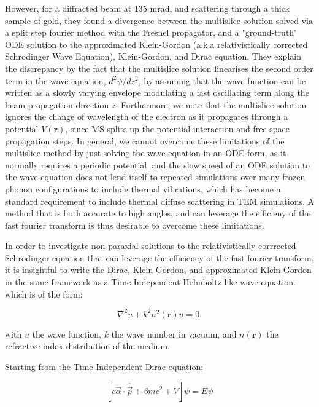 \documentclass{article}
\begin{document}
However, for a diffracted beam at 135 mrad, and scattering through a thick sample of gold, they found a divergence between the multislice solution solved via a split step fourier method with the Fresnel propagator,
and a "ground-truth" ODE solution to the approximated Klein-Gordon (a.k.a relativistically corrected Schrodinger Wave Equation), Klein-Gordon, and Dirac equation.
They explain the discrepancy by the fact that the multislice solution linearises the second order term in the wave equation,
$d^2 \psi / dz^2$, by assuming that the wave function can be written as a slowly varying envelope modulating a fast oscillating term along the beam propagation direction $z$.
Furthermore, we note that the multislice solution ignores the change of wavelength of the electron as it propagates through a potential $V(\mathbf{r})$, since MS splits up the potential interaction and free space propagation steps.
In general, we cannot overcome these limitations of the multislice method by just solving the wave equation in an ODE form, as it normally requires a periodic potential, and the 
slow speed of an ODE solution to the wave equation does not lend itself to repeated simulations over many frozen phonon configurations to include thermal vibrations,
which has become a standard requirement to include thermal diffuse scattering in TEM simulations. A method that is both accurate to high angles, and can leverage the efficieny of the fast fourier transform
is thus desirable to overcome these limitations.

In order to investigate non-paraxial solutions to the relativistically corrrected Schrodinger equation that can leverage the efficiency of the fast fourier transform, 
it is insightful to write the Dirac, Klein-Gordon, and approximated Klein-Gordon in the same framework as a Time-Independent Helmholtz like wave equation.
which is of the form:

\begin{equation}
\label{eq:helmholtz}
\nabla^2 u + k^2 n^2(\mathbf{r}) u = 0.
\end{equation}

with $u$ the wave function, $k$ the wave number in vacuum, and $n(\mathbf{r})$ the refractive index distribution of the medium.

Starting from the Time Independent Dirac equation:

\begin{equation}
\label{eq:dirac_timeindep}
\left[ c \vec{\alpha} \cdot \hat{\vec{p}} + \beta mc^2 + V \right] \psi = E \psi
\end{equation}
\end{document}

